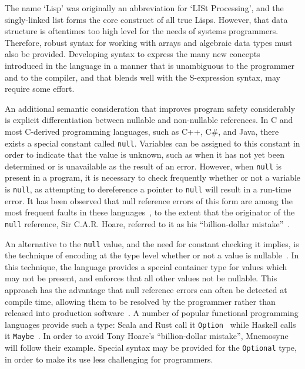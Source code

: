 \documentclass[11pt,a4paper]{article}
\theoremstyle{break}
\begin{document}
The name `Lisp' was originally an abbreviation for `LISt Processing', and the singly-linked list forms the core construct of all true Lisps. However, that data structure is oftentimes too high level for the needs of systems programmers. Therefore, robust syntax for working with arrays and algebraic data types must also be provided. Developing syntax to express the many new concepts introduced in the language in a manner that is unambiguous to the programmer and to the compiler, and that blends well with the S-expression syntax, may require some effort.

An additional semantic consideration that improves program safety considerably is explicit differentiation between nullable and non-nullable references. In C and most C-derived programming languages, such as C++, C\#, and Java, there exists a special constant called \texttt{null}. Variables can be assigned to this constant in order to indicate that the value is unknown, such as when it has not yet been determined or is unavailable as the result of an error. However, when \texttt{null} is present in a program, it is necessary to check frequently whether or not a variable is \texttt{null}, as attempting to dereference a pointer to \texttt{null} will result in a run-time error. It has been observed that null reference errors of this form are among the most frequent faults in these languages~\cite{Duff:2009:GNC:1541788.1541792,Chalin:2007:NRD:2394758.2394776,Fahndrich:2003:DCN:949343.949332}, to the extent that the originator of the \texttt{null} reference, Sir C.A.R. Hoare, referred to it as his ``billion-dollar mistake''~\cite{hoare2009null}.

An alternative to the \texttt{null} value, and the need for constant checking it implies, is the technique of encoding at the type level whether or not a value is nullable~\cite{Fahndrich:2003:DCN:949343.949332}. In this technique, the language provides a special container type for values which may not be present, and enforces that all other values not be nullable. This approach has the advantage that null reference errors can often be detected at compile time, allowing them to be resolved by the programmer rather than released into production software~\cite{Fahndrich:2003:DCN:949343.949332}. A number of popular functional programming languages provide such a type: Scala and Rust call it \texttt{Option}~\cite{odersky2004scala,odersky2004overview,Matsakis:2014:RL:2663171.2663188} while Haskell calls it \texttt{Maybe}~\cite{jones2003haskell,hudak1992gentle}. In order to avoid Tony Hoare's ``billion-dollar mistake'', Mnemosyne will follow their example. Special syntax may be provided for the \texttt{Optional} type, in order to make its use less challenging for programmers.
\end{document}
